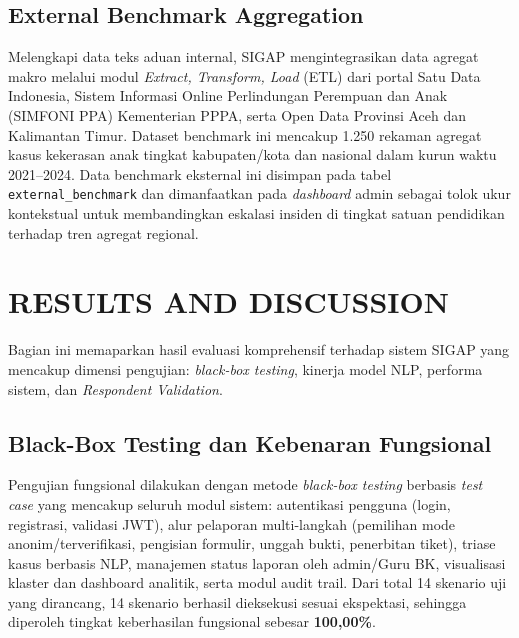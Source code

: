 \documentclass[conference]{IEEEtran}
\begin{document}
\subsection{External Benchmark Aggregation}

Melengkapi data teks aduan internal, SIGAP mengintegrasikan data agregat makro melalui modul \textit{Extract, Transform, Load} (ETL) dari portal Satu Data Indonesia, Sistem Informasi Online Perlindungan Perempuan dan Anak (SIMFONI PPA) Kementerian PPPA, serta Open Data Provinsi Aceh dan Kalimantan Timur. Dataset benchmark ini mencakup 1.250 rekaman agregat kasus kekerasan anak tingkat kabupaten/kota dan nasional dalam kurun waktu 2021--2024. Data benchmark eksternal ini disimpan pada tabel \texttt{external\_benchmark} dan dimanfaatkan pada \textit{dashboard} admin sebagai tolok ukur kontekstual untuk membandingkan eskalasi insiden di tingkat satuan pendidikan terhadap tren agregat regional.

\section{RESULTS AND DISCUSSION}

Bagian ini memaparkan hasil evaluasi komprehensif terhadap sistem SIGAP yang mencakup dimensi pengujian: \textit{black-box testing}, kinerja model NLP, performa sistem, dan \textit{Respondent Validation}.

\subsection{Black-Box Testing dan Kebenaran Fungsional}

Pengujian fungsional dilakukan dengan metode \textit{black-box testing} berbasis \textit{test case} yang mencakup seluruh modul sistem: autentikasi pengguna (login, registrasi, validasi JWT), alur pelaporan multi-langkah (pemilihan mode anonim/terverifikasi, pengisian formulir, unggah bukti, penerbitan tiket), triase kasus berbasis NLP, manajemen status laporan oleh admin/Guru BK, visualisasi klaster dan dashboard analitik, serta modul audit trail. Dari total 14 skenario uji yang dirancang, 14 skenario berhasil dieksekusi sesuai ekspektasi, sehingga diperoleh tingkat keberhasilan fungsional sebesar \textbf{100,00\%}.
\end{document}
